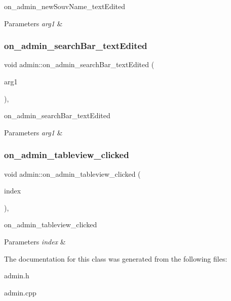 on\+\_\+admin\+\_\+new\+Souv\+Name\+\_\+text\+Edited 


\begin{DoxyParams}{Parameters}
{\em arg1} & \\
\hline
\end{DoxyParams}
\mbox{\label{classadmin_a91ddd44ba1bd8aae1fbe23d3d5d1a203}} 
\subsubsection{\texorpdfstring{on\+\_\+admin\+\_\+search\+Bar\+\_\+text\+Edited}{on\_admin\_searchBar\_textEdited}}
{\footnotesize\ttfamily void admin\+::on\+\_\+admin\+\_\+search\+Bar\+\_\+text\+Edited (\begin{DoxyParamCaption}\item[{const Q\+String \&}]{arg1 }\end{DoxyParamCaption})\hspace{0.3cm}{\ttfamily [private]}, {\ttfamily [slot]}}



on\+\_\+admin\+\_\+search\+Bar\+\_\+text\+Edited 


\begin{DoxyParams}{Parameters}
{\em arg1} & \\
\hline
\end{DoxyParams}
\mbox{\label{classadmin_a566ec88e09d7802376d9cc7bbd38efb1}} 
\subsubsection{\texorpdfstring{on\+\_\+admin\+\_\+tableview\+\_\+clicked}{on\_admin\_tableview\_clicked}}
{\footnotesize\ttfamily void admin\+::on\+\_\+admin\+\_\+tableview\+\_\+clicked (\begin{DoxyParamCaption}\item[{const Q\+Model\+Index \&}]{index }\end{DoxyParamCaption})\hspace{0.3cm}{\ttfamily [private]}, {\ttfamily [slot]}}



on\+\_\+admin\+\_\+tableview\+\_\+clicked 


\begin{DoxyParams}{Parameters}
{\em index} & \\
\hline
\end{DoxyParams}


The documentation for this class was generated from the following files\+:\begin{DoxyCompactItemize}
\item 
admin.\+h\item 
admin.\+cpp\end{DoxyCompactItemize}
